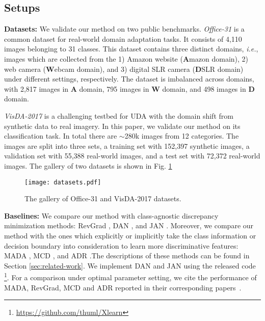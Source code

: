 \documentclass[10pt,twocolumn,letterpaper]{article}
\begin{document}
\subsection{Setups}
\noindent\textbf{Datasets:} We validate our method on two public benchmarks. \emph{Office-31} \cite{saenko2010adapting} is a common dataset for real-world domain adaptation tasks. 
It consists of 4,110 images belonging to 31 classes. 
This dataset contains three distinct domains, \emph{i.e.}, images which are collected from the 1) Amazon website (\textbf{A}mazon domain), 
2) web camera (\textbf{W}ebcam domain), 
and 3) digital SLR camera (\textbf{D}SLR domain) under different settings, respectively.
The dataset is imbalanced across domains, 
with 2,817 images in \textbf{A} domain, 795 images in \textbf{W} domain, and 498 images in \textbf{D} domain.

\noindent\emph{VisDA-2017} \cite{peng2017visda} is a challenging testbed for UDA 
with the domain shift from synthetic data to real imagery.
In this paper, we validate our method on its classification task.
In total there are $\sim$280k images from 12 categories.
The images are split into three sets, \ie a training set with 152,397 synthetic images,
a validation set with 55,388 real-world images,
and a test set with 72,372 real-world images.
The gallery of two datasets is shown in Fig. \ref{fig:gallery}
\begin{figure}[t]
\texttt{[image: datasets.pdf]}
\caption{\label{fig:gallery}
The gallery of Office-31 and VisDA-2017 datasets.
}
\vspace{-5mm}
\end{figure}

\noindent \textbf{Baselines:}
We compare our method with class-agnostic discrepancy minimization methods:
RevGrad \cite{ganin2014unsupervised,ganin2016domain}, DAN \cite{long2015learning}, and 
JAN \cite{long2017deep}. Moreover, we compare our method with the ones which explicitly or implicitly 
take the class information or decision boundary into consideration to learn 
more discriminative features: MADA \cite{pei2018multi}, MCD \cite{saito2017maximum}, 
and ADR \cite{saito2017adversarial}.The descriptions of these methods can be found in 
Section \ref{sec:related-work}.
We implement DAN and JAN using the released code \footnote{\url{https://github.com/thuml/Xlearn}}.
For a comparison under optimal parameter setting, we cite the performance of MADA, RevGrad, MCD and ADR reported in their corresponding papers~\cite{pei2018multi,saito2017adversarial,saito2017maximum,ganin2014unsupervised}.
\end{document}
